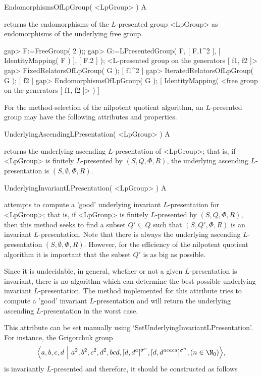 \> EndomorphismsOfLpGroup( <LpGroup> ) A

returns the endomorphisms of the $L$-presented group <LpGroup> as
endomorphisms of the underlying free group.

\beginexample
gap> F:=FreeGroup( 2 );;
gap> G:=LPresentedGroup( F, [ F.1^2 ], [ IdentityMapping( F ) ], [ F.2 ] );
<L-presented group on the generators [ f1, f2 ]>
gap> FixedRelatorsOfLpGroup( G );
[ f1^2 ]
gap> IteratedRelatorsOfLpGroup( G );
[ f2 ]
gap> EndomorphismsOfLpGroup( G );
[ IdentityMapping( <free group on the generators [ f1, f2 ]> ) ]
\endexample


For the method-selection of the nilpotent quotient algorithm, an
$L$-presented group may have the following attributes and properties.

\> UnderlyingAscendingLPresentation( <LpGroup> ) A

returns the underlying ascending $L$-presentation of <LpGroup>; that
is, if <LpGroup> is finitely $L$-presented by $(S,Q,\Phi,R)$, the
underlying ascending $L$-presentation is $(S,\emptyset,\Phi,R)$.

\> UnderlyingInvariantLPresentation( <LpGroup> ) A

attempts to compute a 'good' underlying invariant $L$-presentation
for <LpGroup>; that is, if <LpGroup> is finitely $L$-presented by
$(S,Q,\Phi,R)$, then this method seeks to find a subset $Q'\subseteq Q$
such that $(S,Q',\Phi,R)$ is an invariant $L$-presentation. Note
that there is always the underlying ascending $L$-presentation
$(S,\emptyset,\Phi,R)$. However, for the efficiency of the nilpotent
quotient algorithm it is important that the subset $Q'$ is as big as
possible.

Since it is undecidable, in general, whether or not a given $L$-presentation
is invariant, there is no algorithm which can determine the best
possible underlying invariant $L$-presentation. The method implemented for
this attribute tries to compute a 'good' invariant $L$-presentation and
will return the underlying ascending $L$-presentation in the worst case.

This attribute can be set manually using
`SetUnderlyingInvariantLPresentation'. For instance, the Gri\-gorchuk group 
$$ \Big\langle a,b,c,d~\Big|~a^2,b^2,c^2,d^2,bcd,[d,d^a]^{\sigma^n},
   [d,d^{acaca}]^{\sigma^n},(n\in\N_0) \Big\rangle,$$
is invariantly $L$-presented and therefore, it should be constructed
as follows

